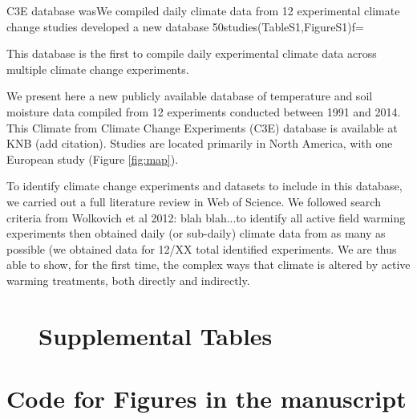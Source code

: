 \documentclass{article}
\begin{document}
C3E database wasWe compiled daily climate data from 12 experimental climate change studies developed a new database 50studies(TableS1,FigureS1)f=

This database is the first to compile daily experimental climate data across multiple climate change experiments.

\par We present here a new publicly  available database of temperature and soil moisture data compiled from 12 experiments conducted between 1991 and 2014. This Climate from Climate Change Experiments (C3E) database is available at KNB (add citation). Studies are located primarily in North America, with one European study (Figure \ref{fig:map}).

\par To identify climate change experiments and datasets to include in this database, we carried out a full literature review in Web of Science. We followed search criteria from Wolkovich et al 2012: blah blah...to identify all active field warming experiments then obtained daily (or sub-daily) climate data from as many as possible (we obtained data for 12/XX total identified experiments. We are thus able to show, for the first time, the complex ways that climate is altered by active warming treatments, both directly and indirectly. 




 \begin{figure}[p]
 \centering
\clearpage
\section* {Supplemental Tables}


\label{table:expsites}
 \end{figure}
\clearpage
\section* {Code for Figures in the manuscript}
\end{document}
